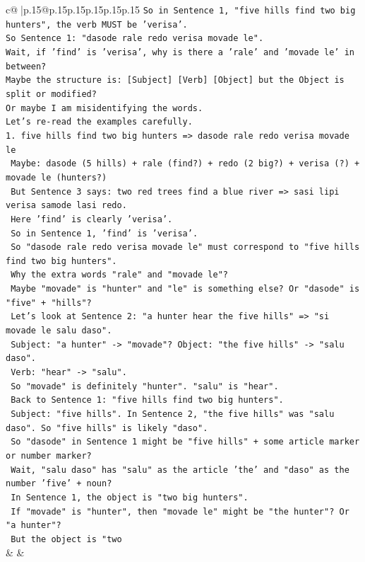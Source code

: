 \documentclass{article}
\begin{document}
{\begin{supertabular}{c@{$\;$}|p{.15\linewidth}@{}p{.15\linewidth}p{.15\linewidth}p{.15\linewidth}p{.15\linewidth}p{.15\linewidth}}
{{{\texttt{So in Sentence 1, "five hills find two big hunters", the verb MUST be 'verisa'.} \\
\texttt{So Sentence 1: "dasode rale redo verisa movade le".} \\
\texttt{Wait, if 'find' is 'verisa', why is there a 'rale' and 'movade le' in between?} \\
\texttt{Maybe the structure is: {[}Subject{]} {[}Verb{]} {[}Object{]} but the Object is split or modified?} \\
\texttt{Or maybe I am misidentifying the words.} \\
\texttt{Let's re{-}read the examples carefully.} \\
\texttt{1. five hills find two big hunters => dasode rale redo verisa movade le} \\
\texttt{   Maybe: dasode (5 hills) + rale (find?) + redo (2 big?) + verisa (?) + movade le (hunters?)} \\
\texttt{   But Sentence 3 says: two red trees find a blue river => sasi lipi verisa samode lasi redo.} \\
\texttt{   Here 'find' is clearly 'verisa'.} \\
\texttt{   So in Sentence 1, 'find' is 'verisa'.} \\
\texttt{   So "dasode rale redo verisa movade le" must correspond to "five hills find two big hunters".} \\
\texttt{   Why the extra words "rale" and "movade le"?} \\
\texttt{   Maybe "movade" is "hunter" and "le" is something else? Or "dasode" is "five" + "hills"?} \\
\texttt{   Let's look at Sentence 2: "a hunter hear the five hills" => "si movade le salu daso".} \\
\texttt{   Subject: "a hunter" {-}> "movade"? Object: "the five hills" {-}> "salu daso".} \\
\texttt{   Verb: "hear" {-}> "salu".} \\
\texttt{   So "movade" is definitely "hunter". "salu" is "hear".} \\
\texttt{   Back to Sentence 1: "five hills find two big hunters".} \\
\texttt{   Subject: "five hills". In Sentence 2, "the five hills" was "salu daso". So "five hills" is likely "daso".} \\
\texttt{   So "dasode" in Sentence 1 might be "five hills" + some article marker or number marker?} \\
\texttt{   Wait, "salu daso" has "salu" as the article 'the' and "daso" as the number 'five' + noun?} \\
\texttt{   In Sentence 1, the object is "two big hunters".} \\
\texttt{   If "movade" is "hunter", then "movade le" might be "the hunter"? Or "a hunter"?} \\
\texttt{   But the object is "two} \\
            }
        }
    }
    & & \\ \\


\end{supertabular}}
\end{document}

